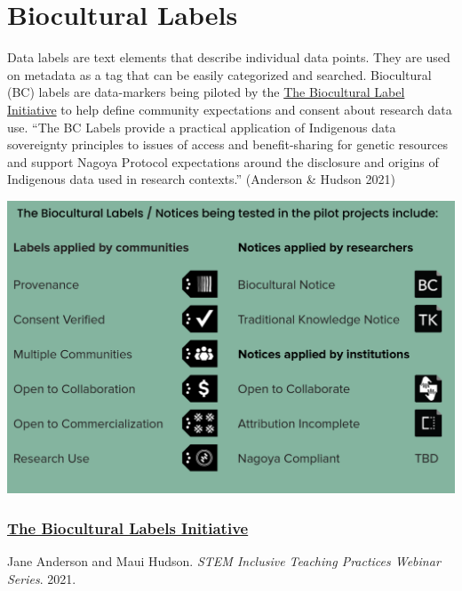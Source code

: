 \documentclass[
]{book}
\begin{document}
\hypertarget{biocultural-labels}{%
\section{Biocultural Labels}\label{biocultural-labels}}

Data labels are text elements that describe individual data points. They are used on metadata as a tag that can be easily categorized and searched. Biocultural (BC) labels are data-markers being piloted by the \href{https://www.enrich-hub.org/bc-labels}{The Biocultural Label Initiative} to help define community expectations and consent about research data use. ``The BC Labels provide a practical application of Indigenous data sovereignty principles to issues of access and benefit-sharing for genetic resources and support Nagoya Protocol expectations around the disclosure and origins of Indigenous data used in research contexts.'' (Anderson \& Hudson 2021)

\includegraphics[width=21.36in]{images/biocultural_labels}

\hypertarget{the-biocultural-labels-initiative}{%
\subsubsection*{\texorpdfstring{\href{https://qubeshub.org/publications/2326/1}{The Biocultural Labels Initiative}}{The Biocultural Labels Initiative}}\label{the-biocultural-labels-initiative}}

Jane Anderson and Maui Hudson. \emph{STEM Inclusive Teaching Practices Webinar Series}. 2021.
\end{document}
